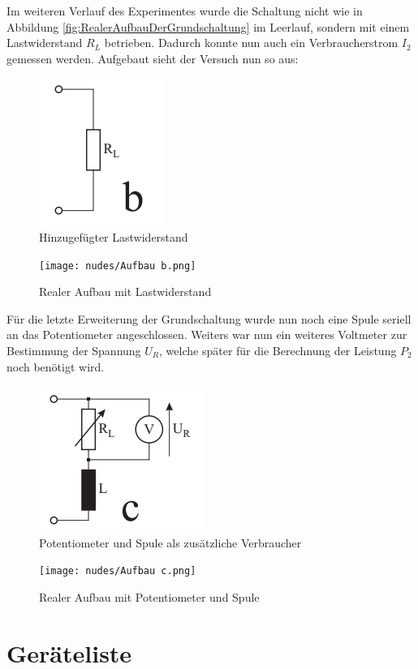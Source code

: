 \documentclass[12pt,a4paper,twoside]{article}
\begin{document}
\noindent
Im weiteren Verlauf des Experimentes wurde die Schaltung nicht wie in Abbildung \ref{fig:RealerAufbauDerGrundschaltung} im Leerlauf, sondern mit einem Lastwiderstand $R_{L}$ betrieben. Dadurch konnte nun auch ein Verbraucherstrom $I_{2}$ gemessen werden. Aufgebaut sieht der Versuch nun so aus:

\begin{figure}[H]
    \centering
    \includegraphics[width=0.2\linewidth, angle=0]{nudes/Versuchsaufbau b.png}
    \caption{Hinzugefügter Lastwiderstand}
    \label{fig:AufbauB}
\end{figure}

\begin{figure}[H]
    \centering
    \texttt{[image: nudes/Aufbau b.png]}
    \caption{Realer Aufbau mit Lastwiderstand}
    \label{fig:RealerAufbauB}
\end{figure}

\noindent
Für die letzte Erweiterung der Grundschaltung wurde nun noch eine Spule seriell an das Potentiometer angeschlossen. Weiters war nun ein weiteres Voltmeter zur Bestimmung der Spannung $U_{R}$, welche später für die Berechnung der Leistung $P_{2}$ noch benötigt wird.

\begin{figure}[H]
    \centering
    \includegraphics[width=0.2\linewidth, angle=0]{nudes/Versuchsaufbau c.png}
    \caption{Potentiometer und Spule als zusätzliche Verbraucher}
    \label{fig:AufbauC}
\end{figure}

\begin{figure}[H]
    \centering
    \texttt{[image: nudes/Aufbau c.png]}
    \caption{Realer Aufbau mit Potentiometer und Spule}
    \label{fig:RealerAufbauC}
\end{figure}



\section{Geräteliste} %
\end{document}
